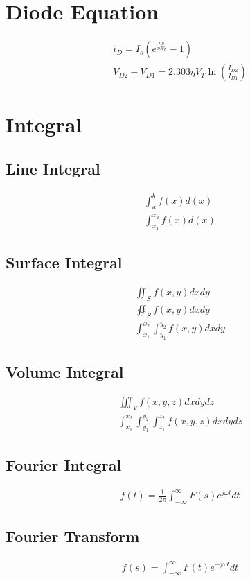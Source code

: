\documentclass{article}
\begin{document}
\section{Diode Equation}
\begin{eqnarray}
i_D = I_s(e^\frac{v_{D}}{\eta.V_{T}}-1)\\
V_{D2}-V_{D1} = 2.303\eta V_T\ln(\frac{I_{D2}}{I_{D1}})
\end{eqnarray}
\section{Integral}
\subsection{Line Integral}
\begin{eqnarray}
\int_{a}^{b}f(x)d(x)\\
\int_{x_1}^{x_2}f(x)d(x)
\end{eqnarray}

\subsection{Surface Integral}
\begin{eqnarray}
\iint_Sf(x,y)dxdy\\
\oiint_S f(x,y)dxdy\\
\int_{x_1}^{x_2}\int_{y_1}^{y_2}f(x,y)dxdy
\end{eqnarray}

\subsection{Volume Integral}
\begin{eqnarray}
\iiint_Vf(x,y,z)dxdydz\\
\int_{x_1}^{x_2}\int_{y_1}^{y_2}\int_{z_1}^{z_2}f(x,y,z)dxdydz
\end{eqnarray}

\subsection{Fourier Integral}
\begin{eqnarray}
f(t) = \frac{1}{2\pi}\int_{-\infty}^{\infty}F(s)e^{j\omega t}dt
\end{eqnarray}

\subsection{Fourier Transform}
\begin{eqnarray}
f(s) = \int_{-\infty}^{\infty}F(t)e^{-j\omega t}dt
\end{eqnarray}
\end{document}
